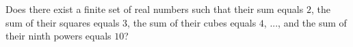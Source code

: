 Does there exist a finite set of real numbers such that their sum equals $2$,  the sum of their squares equals $3$,  the sum of their cubes equals $4$,  ..., and the sum of their ninth powers equals $10$?